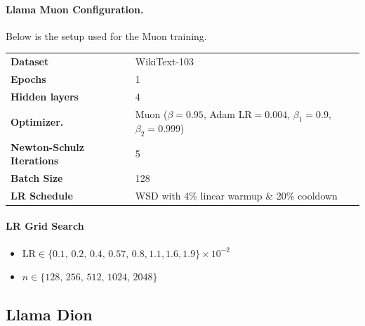 \paragraph{Llama Muon Configuration.}
Below is the setup used for the Muon training.  

\begin{table}[ht]
\centering
\small
\renewcommand{\arraystretch}{1.2}
\begin{tabular}{@{}ll@{}}
\toprule
\textbf{Dataset}       & WikiText-103                                        \\ 
\addlinespace
\textbf{Epochs}        & 1                                                   \\ 
\addlinespace
\textbf{Hidden layers} & 4                                                   \\ 
\addlinespace
\textbf{Optimizer.}     & Muon ($\beta=0.95$, Adam LR$=0.004$, $\beta_1 = 0.9$, $\beta_2 = 0.999$) \\ 
\addlinespace
\textbf{Newton-Schulz Iterations} & 5 \\
\addlinespace
\textbf{Batch Size} & 128 \\
\addlinespace
\textbf{LR Schedule}   & WSD with 4\% linear warmup \& 20\% cooldown         \\ 
\bottomrule
\end{tabular}
\end{table}

\paragraph{LR Grid Search}
\begin{itemize}[nosep,leftmargin=*]
  \item \(\displaystyle \mathrm{LR} \in \{0.1,\,0.2,\,0.4,\,0.57,\,0.8,1.1,1.6,1.9\}\times10^{-2}\)
  
  \vspace{2mm}
  
  \item \(n \in \{128,\,256,\,512,\,1024,\,2048\}\)
\end{itemize}


\subsection{Llama Dion}\label{app:llama_dion}

